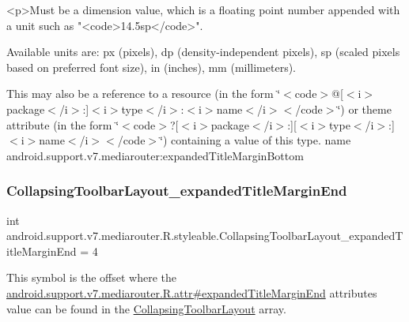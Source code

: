 \begin{DoxyVerb}      <p>Must be a dimension value, which is a floating point number appended with a unit such as "<code>14.5sp</code>".
\end{DoxyVerb}
 Available units are\+: px (pixels), dp (density-\/independent pixels), sp (scaled pixels based on preferred font size), in (inches), mm (millimeters). 

This may also be a reference to a resource (in the form \char`\"{}$<$code$>$@\mbox{[}$<$i$>$package$<$/i$>$\+:\mbox{]}$<$i$>$type$<$/i$>$\+:$<$i$>$name$<$/i$>$$<$/code$>$\char`\"{}) or theme attribute (in the form \char`\"{}$<$code$>$?\mbox{[}$<$i$>$package$<$/i$>$\+:\mbox{]}\mbox{[}$<$i$>$type$<$/i$>$\+:\mbox{]}$<$i$>$name$<$/i$>$$<$/code$>$\char`\"{}) containing a value of this type.  name android.\+support.\+v7.\+mediarouter\+:expanded\+Title\+Margin\+Bottom \mbox{\label{classandroid_1_1support_1_1v7_1_1mediarouter_1_1R_1_1styleable_a99ffdbdeb16dfbadacaf7acae56a72e8}} 
\subsubsection{\texorpdfstring{Collapsing\+Toolbar\+Layout\+\_\+expanded\+Title\+Margin\+End}{CollapsingToolbarLayout\_expandedTitleMarginEnd}}
{\footnotesize\ttfamily int android.\+support.\+v7.\+mediarouter.\+R.\+styleable.\+Collapsing\+Toolbar\+Layout\+\_\+expanded\+Title\+Margin\+End = 4\hspace{0.3cm}{\ttfamily [static]}}

This symbol is the offset where the \hyperlink{classandroid_1_1support_1_1v7_1_1mediarouter_1_1R_1_1attr_ae7382f06326cf8a453209c07b9d50216}{android.\+support.\+v7.\+mediarouter.\+R.\+attr\#expanded\+Title\+Margin\+End} attribute\textquotesingle{}s value can be found in the \hyperlink{classandroid_1_1support_1_1v7_1_1mediarouter_1_1R_1_1styleable_aae2cb4975e9b9a19d129888f497cc386}{Collapsing\+Toolbar\+Layout} array.


